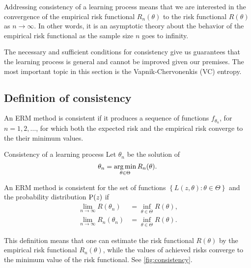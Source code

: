 Addressing consistency of a learning process means that we are interested in the
convergence of the empirical risk functional $R_n(\theta)$ to the risk functional
$R(\theta)$ as $n \to \infty$.  In other words, it is an asymptotic theory about the
behavior of the empirical risk functional as the sample size $n$ goes to infinity.

The necessary and sufficient conditions for consistency give us guarantees that the learning
process is general and cannot be improved given our premises.  The most important topic in
this section is the Vapnik-Chervonenkis (VC) entropy.

\subsection{Definition of consistency}

An ERM method is consistent if it produces a sequence of functions $f_{\theta_n}$, for
$n = 1, 2, \dots$, for which both the expected risk and the empirical risk converge to the
their minimum values.

\begin{defbox}{Consistency of a learning process}{}
  Let $\theta_n$ be the solution of
  \begin{equation*}
    \theta_n = \operatorname*{arg\,min}_{\theta \in \Theta} R_n(\theta)\text{.}
  \end{equation*}

  An ERM method is consistent for the set of functions $\left\{ L(z, \theta) : \theta \in
  \Theta \right\}$ and the probability distribution $\operatorname{P}(z)$ if
  \begin{align*}
    \lim_{n \to \infty} R(\theta_n) &= \inf_{\theta \in \Theta} R(\theta)\text{,} \\
    \lim_{n \to \infty} R_n(\theta_n) &= \inf_{\theta \in \Theta} R(\theta)\text{.}
  \end{align*}
\end{defbox}

This definition means that one can estimate the risk functional $R(\theta)$ by the
empirical risk functional $R_n(\theta)$, while the values of achieved risks converge to
the minimum value of the risk functional.  See \cref{fig:consistency}.

